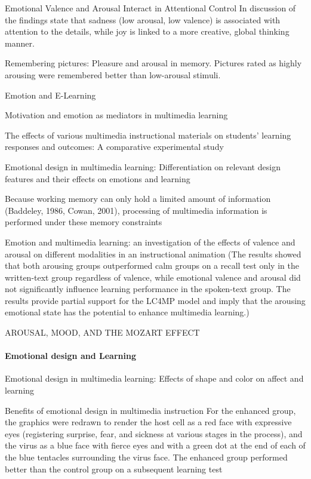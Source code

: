 		\cite{Jefferies2008} Emotional Valence and Arousal Interact in Attentional Control
		In discussion of the findings \cite{Jefferies2008} state that sadness (low arousal, low valence) is associated with attention to the details, while joy is linked to a more creative, global thinking manner.
		
		\cite{Bradley1992} Remembering pictures: Pleasure and arousal in memory.
		 Pictures rated as highly arousing were remembered better than low-arousal stimuli.
		
		\cite{Sternberg2010} Emotion and E-Learning
		
		\cite{Leutner2014} Motivation and emotion as mediators in multimedia learning
		
		\cite{Lee2014} The effects of various multimedia instructional materials on students’ learning responses and outcomes: A comparative experimental study
		
		\cite{Heidig2015} Emotional design in multimedia learning: Differentiation on relevant design features and their effects on emotions and learning
		
		\cite{Plass2016} Because working memory can only hold a limited amount of information (Baddeley, 1986, Cowan, 2001), processing of multimedia information is performed under these memory constraints
		
		\cite{Chung2015} Emotion and multimedia learning: an investigation of the effects of valence and arousal on different modalities in an instructional animation (The results showed that both arousing groups outperformed calm groups on a recall test only in the written-text group regardless of valence, while emotional valence and arousal did not significantly influence learning performance in the spoken-text group. The results provide partial support for the LC4MP model and imply that the arousing emotional state has the potential to enhance multimedia learning.)
		
		\cite{Thompson2001} AROUSAL, MOOD, AND THE MOZART EFFECT
		

		
		\paragraph{Emotional design and Learning} 
		
		\cite{Plass2014} Emotional design in multimedia learning: Effects of shape and color on affect and learning
		
		\cite{Mayer2014} Benefits of emotional design in multimedia instruction
		For the enhanced group, the graphics were redrawn to render the host cell as a red face with expressive eyes (registering surprise, fear, and sickness at various stages in the process), and the virus as a blue face with fierce eyes and with a green dot at the end of each of the blue tentacles surrounding the virus face. The enhanced group performed better than the control group on a subsequent learning test
		
